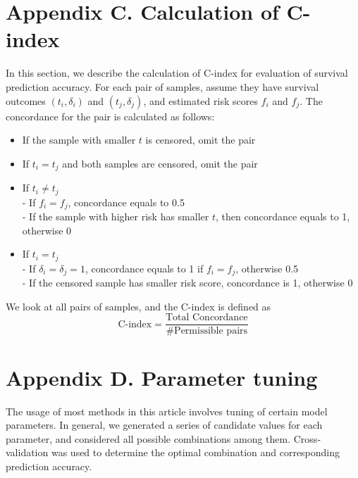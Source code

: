 \documentclass[a4paper,12pt]{article}
\begin{document}
	\newpage
	\section*{Appendix C. Calculation of C-index}
	\label{sec:Cind}
	In this section, we describe the calculation of C-index for evaluation of survival prediction accuracy. For each pair of samples, assume they have survival outcomes $(t_i, \delta_i)$ and $(t_j, \delta_j)$, and estimated risk scores $f_i$ and $f_j$. The concordance for the pair is calculated as follows:
	\begin{itemize}
		\item If the sample with smaller $t$ is censored, omit the pair
		\item If $t_i = t_j$ and both samples are censored, omit the pair
		\item If $t_i \neq t_j$\\
		\qquad - If  $f_i = f_j$, concordance equals to 0.5\\
		\qquad - If the sample with higher risk has smaller $t$, then concordance equals to 1, otherwise 0
		\item If $t_i = t_j$\\
		\qquad - If $\delta_i = \delta_j = 1$, concordance equals to 1 if $f_i = f_j$, otherwise 0.5\\
		\qquad - If the censored sample has smaller risk score, concordance is 1, otherwise 0
		
	\end{itemize}
	We look at all pairs of samples, and the C-index is defined as
	$$\text{C-index} = \frac{ \text{Total Concordance} }{\# \text{Permissible pairs} }$$
	\newpage
	\section*{Appendix D. Parameter tuning}
	\label{sec:tune}
	The usage of most methods in this article involves tuning of certain model parameters. In general, we generated a series of candidate values for each parameter, and considered all possible combinations among them. Cross-validation was used to determine the optimal combination and corresponding prediction accuracy.
	
\end{document}
